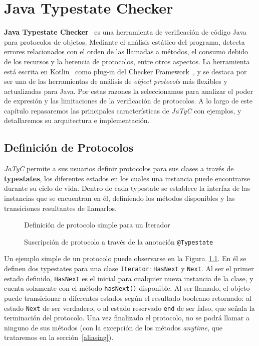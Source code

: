 \chapter{Java Typestate Checker}

\textbf{Java Typestate Checker}~\cite{jatyc:github} es una herramienta de verificación de código Java para protocolos de objetos. Mediante el análisis estático del programa, detecta errores relacionados con el orden de las llamadas a métodos, el consumo debido de los recursos y la herencia de protocolos, entre otros aspectos. La herramienta está escrita en Kotlin~\cite{kotlin} como plug-in del Checker Framework~\cite{checker-framework}, y se destaca por ser una de las herramientas de análisis de \textit{object protocols} más flexibles y actualizadas para Java. Por estas razones la seleccionamos para analizar el poder de expresión y las limitaciones de la verificación de protocolos. A lo largo de este capítulo repasaremos las principales características de \textit{JaTyC} con ejemplos, y detallaremos su arquitectura e implementación.

\section{Definición de Protocolos}

\textit{JaTyC} permite a sus usuarios definir protocolos para sus clases a través de \textbf{typestates}, los diferentes estados en los cuales una instancia puede encontrarse durante su ciclo de vida. Dentro de cada typestate se establece la interfaz de las instancias que se encuentran en él, definiendo los métodos disponibles y las transiciones resultantes de llamarlos.

\begin{figure}[htbp]
    \centering
    
    \caption{Definición de protocolo simple para un Iterador}
    \label{jatyc:iterator}
\end{figure}

\begin{figure}[htbp]
    \centering
    
    \caption{Suscripción de protocolo a través de la anotación \texttt{@Typestate}}
    \label{jatyc:typestate-notation}
\end{figure}

Un ejemplo simple de un protocolo puede observarse en la Figura~\ref{jatyc:iterator}. En él se definen dos typestates para una clase \texttt{Iterator}: \texttt{HasNext} y \texttt{Next}. Al ser el primer estado definido, \texttt{HasNext} es el inicial para cualquier nueva instancia de la clase, y cuenta solamente con el método \texttt{hasNext()} disponible. Al ser llamado, el objeto puede transicionar a diferentes estados según el resultado booleano retornado: al estado \texttt{Next} de ser verdadero, o al estado reservado \texttt{end} de ser falso, que señala la terminación del protocolo. Una vez finalizado el protocolo, no se podrá llamar a ninguno de sus métodos (con la excepción de los métodos \textit{anytime}, que trataremos en la sección~\ref{aliasing}).

